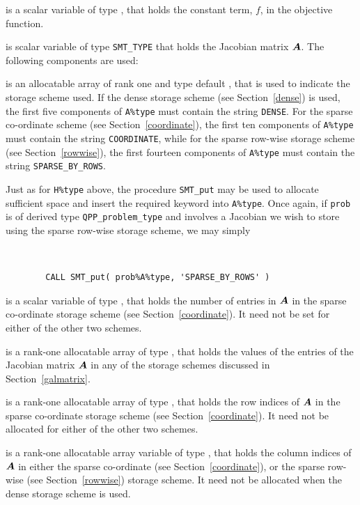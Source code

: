 \documentclass{galahad}
\newcommand{\packagename}{QPP}
\begin{document}
\begin{description}
 is a scalar variable of type 
\realdp, that holds 
the constant term, $f$, in the objective function.

 is scalar variable of type {\tt SMT\_TYPE} 
that holds the Jacobian matrix ${\bm{A}}$. The following components are used:

\begin{description}

 is an allocatable array of rank one and type default \character, 
that is used to indicate the storage scheme used. If the dense storage scheme 
(see Section~\ref{dense}) is used, 
the first five components of {\tt A\%type} must contain the
string {\tt DENSE}.
For the sparse co-ordinate scheme (see Section~\ref{coordinate}), 
the first ten components of {\tt A\%type} must contain the
string {\tt COORDINATE}, while 
for the sparse row-wise storage scheme (see Section~\ref{rowwise}),
the first fourteen components of {\tt A\%type} must contain the
string {\tt SPARSE\_BY\_ROWS}.

Just as for {\tt H\%type} above, the procedure {\tt SMT\_put} 
may be used to allocate sufficient space and insert the required keyword
into {\tt A\%type}.
Once again, if {\tt prob} is of derived type {\tt \packagename\_problem\_type}
and involves a Jacobian we wish to store using the sparse row-wise 
storage scheme, we may simply
{\tt 
\begin{verbatim}
        CALL SMT_put( prob%A%type, 'SPARSE_BY_ROWS' )
\end{verbatim}
}
\noindent

 is a scalar variable of type \integer, that 
holds the number of entries in ${\bm{A}}$
in the sparse co-ordinate storage scheme (see Section~\ref{coordinate}). 
It need not be set for either of the other two schemes.

 is a rank-one allocatable array of type \realdp, that holds
the values of the entries of the Jacobian matrix ${\bm{A}}$ in any of the 
storage schemes discussed in Section~\ref{galmatrix}.

 is a rank-one allocatable array of type \integer,
that holds the row indices of ${\bm{A}}$ in the sparse co-ordinate storage
scheme (see Section~\ref{coordinate}). 
It need not be allocated for either of the other two schemes.

 is a rank-one allocatable array variable of type \integer,
that holds the column indices of ${\bm{A}}$ in either the sparse co-ordinate 
(see Section~\ref{coordinate}), or the sparse row-wise 
(see Section~\ref{rowwise}) storage scheme.
It need not be allocated when the dense storage scheme is used.


\end{description}
\end{description}
\end{document}
